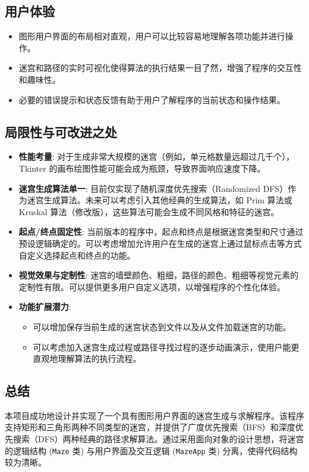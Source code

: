 \documentclass[UTF8]{report}
\theoremstyle{MyLineTheoremStyle} %
\theoremstyle{MyBlockTheoremStyle} %
\theoremstyle{MySubsubsectionStyle} %
\begin{document}
\subsection{用户体验}
\begin{itemize}
    \item 图形用户界面的布局相对直观，用户可以比较容易地理解各项功能并进行操作。
    \item 迷宫和路径的实时可视化使得算法的执行结果一目了然，增强了程序的交互性和趣味性。
    \item 必要的错误提示和状态反馈有助于用户了解程序的当前状态和操作结果。
\end{itemize}

\subsection{局限性与可改进之处}
\begin{itemize}
    \item \textbf{性能考量}: 对于生成非常大规模的迷宫（例如，单元格数量远超过几千个），Tkinter 的画布绘图性能可能会成为瓶颈，导致界面响应速度下降。
    \item \textbf{迷宫生成算法单一}: 目前仅实现了随机深度优先搜索（Randomized DFS）作为迷宫生成算法。未来可以考虑引入其他经典的生成算法，如 Prim 算法或 Kruskal 算法（修改版），这些算法可能会生成不同风格和特征的迷宫。
    \item \textbf{起点/终点固定性}: 当前版本的程序中，起点和终点是根据迷宫类型和尺寸通过预设逻辑确定的。可以考虑增加允许用户在生成的迷宫上通过鼠标点击等方式自定义选择起点和终点的功能。
    \item \textbf{视觉效果与定制性}: 迷宫的墙壁颜色、粗细，路径的颜色、粗细等视觉元素的定制性有限。可以提供更多用户自定义选项，以增强程序的个性化体验。
    \item \textbf{功能扩展潜力}:
    \begin{itemize}
        \item 可以增加保存当前生成的迷宫状态到文件以及从文件加载迷宫的功能。
        \item 可以考虑加入迷宫生成过程或路径寻找过程的逐步动画演示，使用户能更直观地理解算法的执行流程。
    \end{itemize}
\end{itemize}

\subsection{总结}
本项目成功地设计并实现了一个具有图形用户界面的迷宫生成与求解程序。该程序支持矩形和三角形两种不同类型的迷宫，并提供了广度优先搜索（BFS）和深度优先搜索（DFS）两种经典的路径求解算法。通过采用面向对象的设计思想，将迷宫的逻辑结构 (\texttt{Maze} 类) 与用户界面及交互逻辑 (\texttt{MazeApp} 类) 分离，使得代码结构较为清晰。
\end{document}
